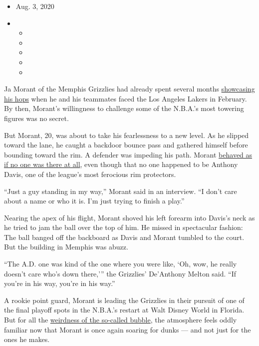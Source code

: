 \begin{itemize}
\item
  Aug. 3, 2020
\item
  \begin{itemize}
  \item
  \item
  \item
  \item
  \item
  \end{itemize}
\end{itemize}

Ja Morant of the Memphis Grizzlies had already spent several months
\href{https://www.nytimes.com/2019/11/02/sports/basketball/ja-morant-memphis-grizzlies.html}{showcasing
his hops} when he and his teammates faced the Los Angeles Lakers in
February. By then, Morant's willingness to challenge some of the
N.B.A.'s most towering figures was no secret.

But Morant, 20, was about to take his fearlessness to a new level. As he
slipped toward the lane, he caught a backdoor bounce pass and gathered
himself before bounding toward the rim. A defender was impeding his
path. Morant \href{https://www.youtube.com/watch?v=de0nkHhxGKI}{behaved
as if no one was there at all}, even though that no one happened to be
Anthony Davis, one of the league's most ferocious rim protectors.

``Just a guy standing in my way,'' Morant said in an interview. ``I
don't care about a name or who it is. I'm just trying to finish a
play.''

Nearing the apex of his flight, Morant shoved his left forearm into
Davis's neck as he tried to jam the ball over the top of him. He missed
in spectacular fashion: The ball banged off the backboard as Davis and
Morant tumbled to the court. But the building in Memphis was abuzz.

``The A.D. one was kind of the one where you were like, `Oh, wow, he
really doesn't care who's down there,''' the Grizzlies' De'Anthony
Melton said. ``If you're in his way, you're in his way.''

A rookie point guard, Morant is leading the Grizzlies in their pursuit
of one of the final playoff spots in the N.B.A.'s restart at Walt Disney
World in Florida. But for all the
\href{https://www.nytimes.com/2020/07/27/sports/basketball/coronavirus-nba-season-bubble-disney-world.html}{weirdness
of the so-called bubble}, the atmosphere feels oddly familiar now that
Morant is once again soaring for dunks --- and not just for the ones he
makes.

